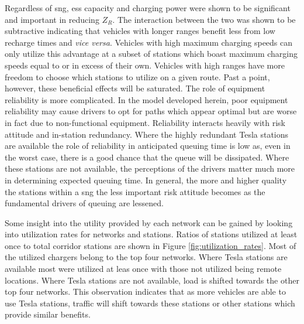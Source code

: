 \begin{multicols}{2}

Regardless of \gls{sng}, \gls{ess} capacity and charging power were shown to be significant and important in reducing $Z_R$. The interaction between the two was shown to be subtractive indicating that vehicles with longer ranges benefit less from low recharge times and \textit{vice versa}. Vehicles with high maximum charging speeds can only utilize this advantage at a subset of stations which boast maximum charging speeds equal to or in excess of their own. Vehicles with high ranges have more freedom to choose which stations to utilize on a given route. Past a point, however, these beneficial effects will be saturated. The role of equipment reliability is more complicated. In the model developed herein, poor equipment reliability may cause drivers to opt for paths which appear optimal but are worse in fact due to non-functional equipment. Reliability interacts heavily with risk attitude and in-station redundancy. Where the highly redundant Tesla stations are available the role of reliability in anticipated queuing time is low as, even in the worst case, there is a good chance that the queue will be dissipated. Where these stations are not available, the perceptions of the drivers matter much more in determining expected queuing time. In general, the more and higher quality the stations within a \gls{sng} the less important risk attitude becomes as the fundamental drivers of queuing are lessened. 
	
Some insight into the utility provided by each network can be gained by looking into utilization rates for networks and stations. Ratios of stations utilized at least once to total corridor stations are shown in Figure \ref{fig:utilization_rates}. Most of the utilized chargers belong to the top four networks. Where Tesla stations are available most were utilized at leas once with those not utilized being remote locations. Where Tesla stations are not available, load is shifted towards the other top four networks. This observation indicates that as more vehicles are able to use Tesla stations, traffic will shift towards these stations or other stations which provide similar benefits.

\end{multicols}

